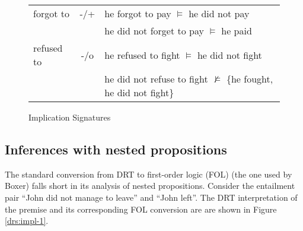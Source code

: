 \begin{figure}
\begin{center}
\begin{tabular}{l c l}
   	forgot to        & -/+ & he forgot to pay $\vDash$ he did not pay \\
   	                 &     & he did not forget to pay $\vDash$ he paid \\
   	\hline
   	refused to       & -/o & he refused to fight $\vDash$ he did not fight \\
   	                 &     & he did not refuse to fight $\nvDash$ \{he fought, he did not fight\} \\
   	\hline
  \end{tabular}
\end{center}
\caption{Implication Signatures}
\label{fig:imp-sig}
\end{figure}

\subsection*{Inferences with nested propositions}

The standard conversion from DRT to first-order logic (FOL) (the one used by
Boxer) falls short in its analysis of nested propositions.  Consider the
entailment pair ``John did not manage to leave'' and ``John left''.  The DRT
interpretation of the premise and its corresponding FOL conversion are are 
shown in Figure \ref{drs:impl-1}.


